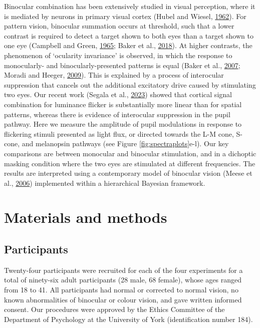 \documentclass[
]{article}
\begin{document}
Binocular combination has been extensively studied in visual perception, where it is mediated by neurons in primary visual cortex (Hubel and Wiesel, \protect\hyperlink{ref-Hubel1962}{1962}). For pattern vision, binocular summation occurs at threshold, such that a lower contrast is required to detect a target shown to both eyes than a target shown to one eye (Campbell and Green, \protect\hyperlink{ref-Campbell1965}{1965}; Baker et al., \protect\hyperlink{ref-Baker2018}{2018}). At higher contrasts, the phenomenon of `ocularity invariance' is observed, in which the response to monocularly- and binocularly-presented patterns is equal (Baker et al., \protect\hyperlink{ref-Baker2007}{2007}; Moradi and Heeger, \protect\hyperlink{ref-Moradi2009}{2009}). This is explained by a process of interocular suppression that cancels out the additional excitatory drive caused by stimulating two eyes. Our recent work (Segala et al., \protect\hyperlink{ref-Segala2023}{2023}) showed that cortical signal combination for luminance flicker is substantially more linear than for spatial patterns, whereas there is evidence of interocular suppression in the pupil pathway. Here we measure the amplitude of pupil modulations in response to flickering stimuli presented as light flux, or directed towards the L-M cone, S-cone, and melanopsin pathways (see Figure \ref{fig:spectraplots}e-l). Our key comparisons are between monocular and binocular stimulation, and in a dichoptic masking condition where the two eyes are stimulated at different frequencies. The results are interpreted using a contemporary model of binocular vision (Meese et al., \protect\hyperlink{ref-Meese2006}{2006}) implemented within a hierarchical Bayesian framework.

\hypertarget{materials-and-methods}{%
\section{Materials and methods}\label{materials-and-methods}}

\hypertarget{participants}{%
\subsection{Participants}\label{participants}}

Twenty-four participants were recruited for each of the four experiments for a total of ninety-six adult participants (28 male, 68 female), whose ages ranged from 18 to 41. All participants had normal or corrected to normal vision, no known abnormalities of binocular or colour vision, and gave written informed consent. Our procedures were approved by the Ethics Committee of the Department of Psychology at the University of York (identification number 184).
\end{document}
